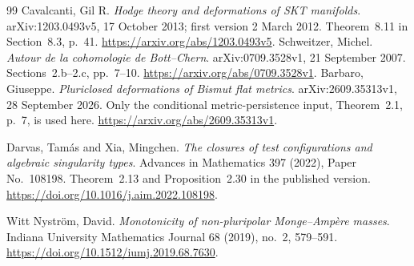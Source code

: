 \documentclass[11pt]{article}
\begin{document}
\begin{thebibliography}{99}
 Cavalcanti, Gil R. \emph{Hodge theory and deformations of SKT manifolds}. arXiv:1203.0493v5, 17 October 2013; first version 2 March 2012. Theorem~8.11 in Section~8.3, p.~41. \url{https://arxiv.org/abs/1203.0493v5}.
 Schweitzer, Michel. \emph{Autour de la cohomologie de Bott--Chern}. arXiv:0709.3528v1, 21 September 2007. Sections~2.b--2.c, pp.~7--10. \url{https://arxiv.org/abs/0709.3528v1}.
 Barbaro, Giuseppe. \emph{Pluriclosed deformations of Bismut flat metrics}. arXiv:2609.35313v1, 28 September 2026. Only the conditional metric-persistence input, Theorem~2.1, p.~7, is used here. \url{https://arxiv.org/abs/2609.35313v1}.

 Darvas, Tam\'as and Xia, Mingchen. \emph{The closures of test configurations and algebraic singularity types}. Advances in Mathematics 397 (2022), Paper No.~108198. Theorem~2.13 and Proposition~2.30 in the published version. \url{https://doi.org/10.1016/j.aim.2022.108198}.

 Witt Nystr\"om, David. \emph{Monotonicity of non-pluripolar Monge--Amp\`ere masses}. Indiana University Mathematics Journal 68 (2019), no.~2, 579--591. \url{https://doi.org/10.1512/iumj.2019.68.7630}.

\end{thebibliography}
\end{document}
